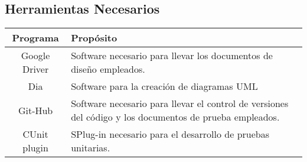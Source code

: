 \subsection{\textcolor[gray]{.2}{Herramientas Necesarios}}
\begin{table}[!h]
\begin{center}
\begin{tabular}{|c|p{100mm}|}
\hline
\rowcolor[gray]{.8} Programa & Propósito \\
\hline
Google Driver & Software necesario para llevar los documentos de diseño empleados.\\
\hline
Dia & Software para la creación de diagramas UML\\
\hline
Git-Hub & Software necesario para llevar el control de versiones del código y los documentos de prueba empleados.\\
\hline
CUnit plugin & SPlug-in necesario para el desarrollo de pruebas unitarias.\\
\hline
\end{tabular}
\end{center}
\end{table}
%
%
%
%
%
%

